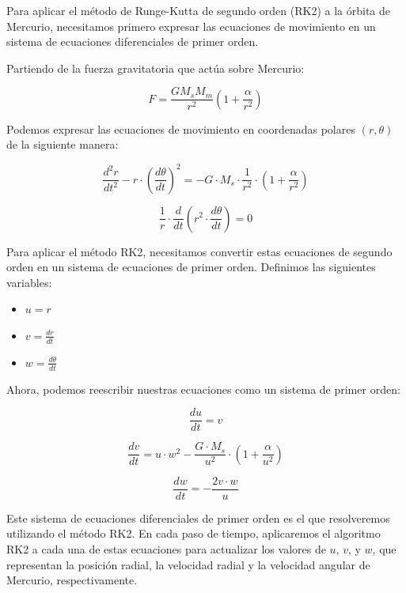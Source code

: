 \documentclass[twocolumn]{article}
\begin{document}
Para aplicar el método de Runge-Kutta de segundo orden (RK2) a la órbita de Mercurio, necesitamos primero expresar las ecuaciones de movimiento en un sistema de ecuaciones diferenciales de primer orden.

Partiendo de la fuerza gravitatoria que actúa sobre Mercurio:

\begin{equation}
F =  \frac{G M_s M_m }{r^2}(1 + \frac{\alpha}{r^2})
\end{equation}

Podemos expresar las ecuaciones de movimiento en coordenadas polares $(r, \theta)$ de la siguiente manera:

\begin{equation}
\frac{d^2r}{dt^2} - r \cdot \left(\frac{d\theta}{dt}\right)^2 = -G \cdot M_s \cdot \frac{1}{r^2} \cdot (1 + \frac{\alpha}{r^2})
\end{equation}

\begin{equation}
\frac{1}{r} \cdot \frac{d}{dt}\left(r^2 \cdot \frac{d\theta}{dt}\right) = 0
\end{equation}

Para aplicar el método RK2, necesitamos convertir estas ecuaciones de segundo orden en un sistema de ecuaciones de primer orden. Definimos las siguientes variables:

\begin{itemize}
\item $u = r$
\item $v = \frac{dr}{dt}$
\item $w = \frac{d\theta}{dt}$
\end{itemize}

Ahora, podemos reescribir nuestras ecuaciones como un sistema de primer orden:

\begin{equation}
\frac{du}{dt} = v
\end{equation}

\begin{equation}
\frac{dv}{dt} = u \cdot w^2 - \frac{G \cdot M_s}{u^2} \cdot (1 + \frac{\alpha}{u^2})
\end{equation}

\begin{equation}
\frac{dw}{dt} = -\frac{2v \cdot w}{u}
\end{equation}

Este sistema de ecuaciones diferenciales de primer orden es el que resolveremos utilizando el método RK2. En cada paso de tiempo, aplicaremos el algoritmo RK2 a cada una de estas ecuaciones para actualizar los valores de $u$, $v$, y $w$, que representan la posición radial, la velocidad radial y la velocidad angular de Mercurio, respectivamente.
\end{document}
